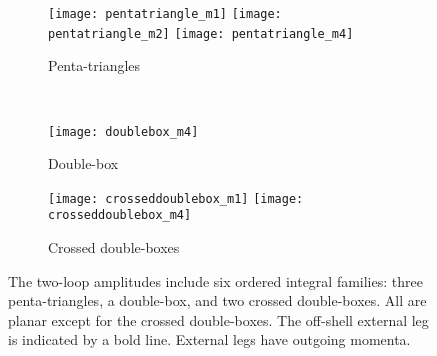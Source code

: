\documentclass[main.tex]{subfiles}
\begin{document}
\begin{figure}
    \begin{center}
        \begin{subfigure}[c]{\linewidth}
            \centering
            \texttt{[image: pentatriangle\_m1]}
            \texttt{[image: pentatriangle\_m2]}
            \texttt{[image: pentatriangle\_m4]}
            \caption{Penta-triangles}
            \label{fig:pentatriangle}
        \end{subfigure}
        \\
        \vspace{1em}
        \begin{subfigure}[c]{0.3\linewidth}
            \centering
            \texttt{[image: doublebox\_m4]}
            \caption{Double-box}
            \label{fig:double-box}
        \end{subfigure}
        \begin{subfigure}[c]{0.6\linewidth}
            \centering
            \texttt{[image: crosseddoublebox\_m1]}
            \texttt{[image: crosseddoublebox\_m4]}
            \caption{Crossed double-boxes}
            \label{fig:crosseddouble-box}
        \end{subfigure}
    \end{center}
    \caption{ 
        The two-loop amplitudes include six ordered integral families: three penta-triangles, a double-box, and two crossed double-boxes.
        All are planar except for the crossed double-boxes.
        The off-shell external leg is indicated by a bold line.
        External legs have outgoing momenta.
    }
    \label{fig:int-fams}
\end{figure}
\end{document}
